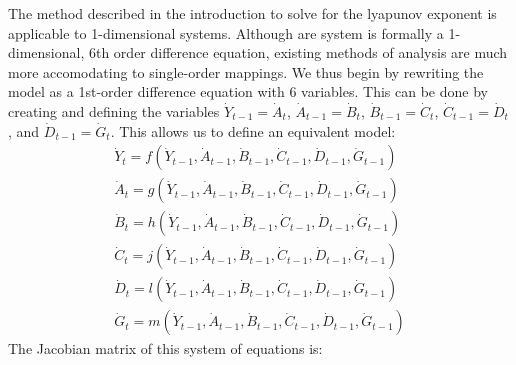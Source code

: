 The method described in the introduction to solve for the lyapunov exponent is applicable to 1-dimensional systems. Although are system is formally a 1-dimensional, 6th order difference equation, existing methods of analysis are much more accomodating to single-order mappings. We thus begin by rewriting the model as a 1st-order difference equation with 6 variables. This can be done by creating and defining the variables $\dot Y_{t-1}=\dot A_t$, $\dot A_{t-1}=\dot B_{t}$, $\dot B_{t-1}=\dot C_{t}$, $\dot C_{t-1}=\dot D_{t}$, and $\dot D_{t-1}=\dot G_{t}$. This allows us to define an equivalent model:
\begin{align*}
    \dot Y_t = f(\dot Y_{t-1}, \dot A_{t-1}, \dot B_{t-1}, \dot C_{t-1}, \dot D_{t-1}, \dot G_{t-1})\\
    \dot A_t = g(\dot Y_{t-1}, \dot A_{t-1}, \dot B_{t-1}, \dot C_{t-1}, \dot D_{t-1}, \dot G_{t-1})\\
    \dot B_t = h(\dot Y_{t-1}, \dot A_{t-1}, \dot B_{t-1}, \dot C_{t-1}, \dot D_{t-1}, \dot G_{t-1})\\
    \dot C_t = j(\dot Y_{t-1}, \dot A_{t-1}, \dot B_{t-1}, \dot C_{t-1}, \dot D_{t-1}, \dot G_{t-1})\\
    \dot D_t = l(\dot Y_{t-1}, \dot A_{t-1}, \dot B_{t-1}, \dot C_{t-1}, \dot D_{t-1}, \dot G_{t-1})\\
    \dot G_t = m(\dot Y_{t-1}, \dot A_{t-1}, \dot B_{t-1}, \dot C_{t-1}, \dot D_{t-1}, \dot G_{t-1})
\end{align*}
The Jacobian matrix of this system of equations is:
